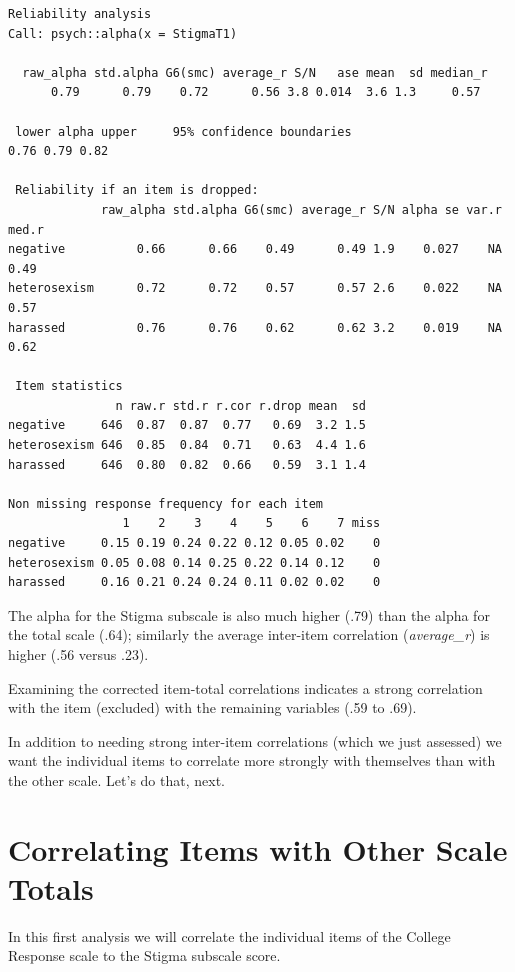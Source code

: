 \documentclass[
  english,
]{book}
\begin{document}
\begin{verbatim}
Reliability analysis   
Call: psych::alpha(x = StigmaT1)

  raw_alpha std.alpha G6(smc) average_r S/N   ase mean  sd median_r
      0.79      0.79    0.72      0.56 3.8 0.014  3.6 1.3     0.57

 lower alpha upper     95% confidence boundaries
0.76 0.79 0.82 

 Reliability if an item is dropped:
             raw_alpha std.alpha G6(smc) average_r S/N alpha se var.r med.r
negative          0.66      0.66    0.49      0.49 1.9    0.027    NA  0.49
heterosexism      0.72      0.72    0.57      0.57 2.6    0.022    NA  0.57
harassed          0.76      0.76    0.62      0.62 3.2    0.019    NA  0.62

 Item statistics 
               n raw.r std.r r.cor r.drop mean  sd
negative     646  0.87  0.87  0.77   0.69  3.2 1.5
heterosexism 646  0.85  0.84  0.71   0.63  4.4 1.6
harassed     646  0.80  0.82  0.66   0.59  3.1 1.4

Non missing response frequency for each item
                1    2    3    4    5    6    7 miss
negative     0.15 0.19 0.24 0.22 0.12 0.05 0.02    0
heterosexism 0.05 0.08 0.14 0.25 0.22 0.14 0.12    0
harassed     0.16 0.21 0.24 0.24 0.11 0.02 0.02    0
\end{verbatim}

The alpha for the Stigma subscale is also much higher (.79) than the alpha for the total scale (.64); similarly the average inter-item correlation (\emph{average\_r}) is higher (.56 versus .23).

Examining the corrected item-total correlations indicates a strong correlation with the item (excluded) with the remaining variables (.59 to .69).

In addition to needing strong inter-item correlations (which we just assessed) we want the individual items to correlate more strongly with themselves than with the other scale. Let's do that, next.

\hypertarget{correlating-items-with-other-scale-totals}{%
\section{Correlating Items with Other Scale Totals}\label{correlating-items-with-other-scale-totals}}

In this first analysis we will correlate the individual items of the College Response scale to the Stigma subscale score.
\end{document}
